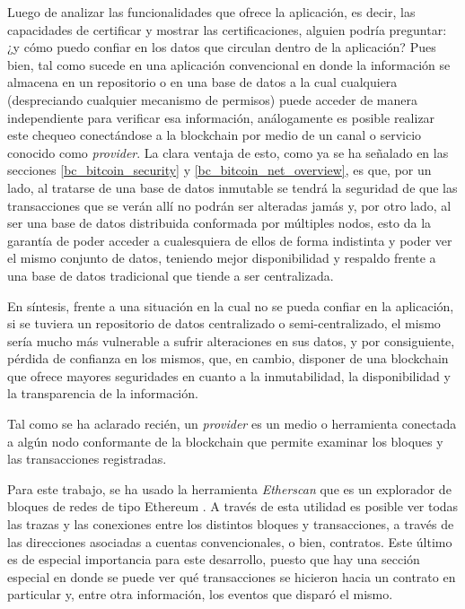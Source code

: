 Luego de analizar las funcionalidades que ofrece la aplicación, es decir, las capacidades de certificar y mostrar las certificaciones, alguien podría preguntar: ¿y cómo puedo confiar en los datos que circulan dentro de la aplicación? Pues bien, tal como sucede en una aplicación convencional en donde la información se almacena en un repositorio o en una base de datos a la cual cualquiera (despreciando cualquier mecanismo de permisos) puede acceder de manera independiente para verificar esa información, análogamente es posible realizar este chequeo conectándose a la blockchain por medio de un canal o servicio conocido como \textit{provider}. La clara ventaja de esto, como ya se ha señalado en las secciones \ref{bc_bitcoin_security} y \ref{bc_bitcoin_net_overview}, es que, por un lado, al tratarse de una base de datos inmutable se tendrá la seguridad de que las transacciones que se verán allí no podrán ser alteradas jamás y, por otro lado, al ser una base de datos distribuida conformada por múltiples nodos, esto da la garantía de poder acceder a cualesquiera de ellos de forma indistinta y poder ver el mismo conjunto de datos, teniendo mejor disponibilidad y respaldo frente a una base de datos tradicional que tiende a ser centralizada.

En síntesis, frente a una situación en la cual no se pueda confiar en la aplicación, si se tuviera un repositorio de datos centralizado o semi-centralizado, el mismo sería mucho más vulnerable a sufrir alteraciones en sus datos, y por consiguiente, pérdida de confianza en los mismos, que, en cambio, disponer de una blockchain que ofrece mayores seguridades en cuanto a la inmutabilidad, la disponibilidad y la transparencia de la información.

Tal como se ha aclarado recién, un \textit{provider} es un medio o herramienta conectada a algún nodo conformante de la blockchain que permite examinar los bloques y las transacciones registradas.

Para este trabajo, se ha usado la herramienta \textit{Etherscan} que es un explorador de bloques de redes de tipo Ethereum \cite{Etherscan2018}. A través de esta utilidad es posible ver todas las trazas y las conexiones entre los distintos bloques y transacciones, a través de las direcciones asociadas a cuentas convencionales, o bien, contratos. Este último es de especial importancia para este desarrollo, puesto que hay una sección especial en donde se puede ver qué transacciones se hicieron hacia un contrato en particular y, entre otra información, los eventos que disparó el mismo.

